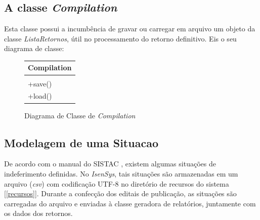 \documentclass[
	12pt,			%
	openright,		%
	oneside,	
	a4paper,		%
	english,		%
	brazil			%
]{abntex2/abntex2}  %
\begin{document}
			\subsection{A classe \textit{Compilation}} \label{compilation}
	
				Esta classe possui a incumbência de gravar ou carregar em arquivo um objeto da classe \textit{ListaRetornos}, útil no processamento do retorno definitivo. Eis o seu diagrama de classe:
	
				\begin{figure}[ht]
					\begin{center}
						
						\caption{Diagrama de Classe de \textit{Compilation}}
						
						\begin{tabular}{|l|}
						\hline
						\multicolumn{1}{|c|}{\textbf{Compilation}} \\ \hline
						\\ \hline
						+save()                                    \\
						+load()                                    \\ \hline
						\end{tabular}
						
					\end{center}
				\end{figure}
	
			\subsection{Modelagem de uma Situacao} \label{situacao}
	
				De acordo com o manual do SISTAC \cite{sistac-formatos}, existem algumas situações de indeferimento definidas. No \textit{IsenSys}, tais situações são armazenadas em um arquivo (\textit{csv}) com codificação UTF-8 no diretório de recursos do sistema [\ref{recursos}]. Durante a confecção dos editais de publicação, as situações são carregadas do arquivo e enviadas à classe geradora de relatórios, juntamente com os dados dos retornos.
	
\end{document}
